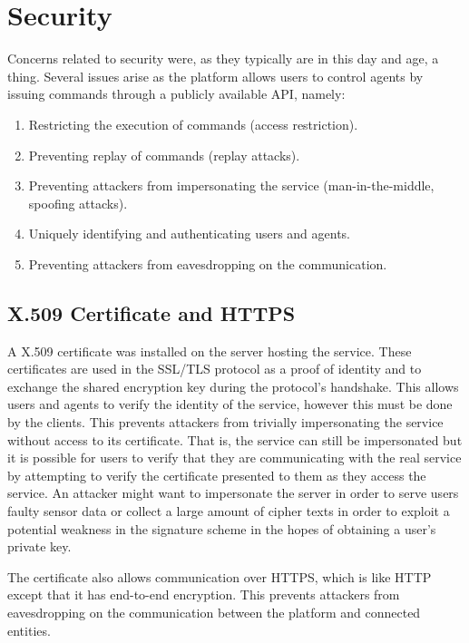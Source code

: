 \section{Security}
Concerns related to security were, as they typically are in this day and age, a thing.
Several issues arise as the platform allows users to control agents by issuing commands through a publicly available API, namely:

\begin{enumerate}
	\item Restricting the execution of commands (access restriction).
	\item Preventing replay of commands (replay attacks).
	\item Preventing attackers from impersonating the service (man-in-the-middle, spoofing attacks).
	\item Uniquely identifying and authenticating users and agents.
	\item Preventing attackers from eavesdropping on the communication.
\end{enumerate}

\subsection{X.509 Certificate and HTTPS}
A X.509 certificate was installed on the server hosting the service.
These certificates are used in the SSL/TLS protocol as a proof of identity and to exchange the shared encryption key during the protocol's handshake.
This allows users and agents to verify the identity of the service, however this must be done by the clients.
This prevents attackers from trivially impersonating the service without access to its certificate.
That is, the service can still be impersonated but it is possible for users to verify that they are communicating with the real service by attempting to verify the certificate presented to them as they access the service.
An attacker might want to impersonate the server in order to serve users faulty sensor data or collect a large amount of cipher texts in order to exploit a potential weakness in the signature scheme in the hopes of obtaining a user's private key.

The certificate also allows communication over HTTPS, which is like HTTP except that it has end-to-end encryption.
This prevents attackers from eavesdropping on the communication between the platform and connected entities.

